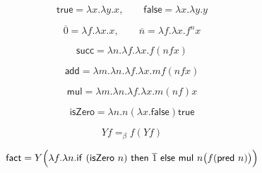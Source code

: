 \documentclass[12pt,a4paper]{article}
\theoremstyle{remark}
\begin{document}
\[
\mathsf{true}=\lambda x.\lambda y.x,
\qquad
\mathsf{false}=\lambda x.\lambda y.y
\]

\[
\overline{0}=\lambda f.\lambda x.x,
\qquad
\overline{n}=\lambda f.\lambda x.f^n x
\]

\[
\mathsf{succ}=\lambda n.\lambda f.\lambda x.f(nfx)
\]

\[
\mathsf{add}=\lambda m.\lambda n.\lambda f.\lambda x.mf(nfx)
\]

\[
\mathsf{mul}=\lambda m.\lambda n.\lambda f.\lambda x.m(nf)x
\]

\[
\mathsf{isZero}=\lambda n.n(\lambda x.\mathsf{false})\mathsf{true}
\]

\[
Yf =_\beta f(Yf)
\]

\[
\mathsf{fact}=Y\Bigl(\lambda f.\lambda n.\mathsf{if}\ (\mathsf{isZero}\ n)\ \mathsf{then}\ \overline{1}\ \mathsf{else}\ \mathsf{mul}\ n\bigl(f(\mathsf{pred}\ n)\bigr)\Bigr)
\]
\end{document}
